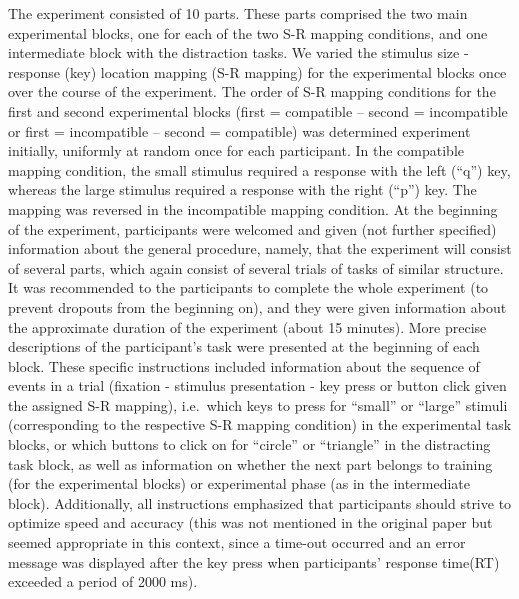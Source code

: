 \documentclass[
  english,
  man,floatsintext]{apa6}
\begin{document}
The experiment consisted of 10 parts. These parts comprised the two main experimental blocks, one for each of the two S-R mapping conditions, and one intermediate block with the distraction tasks. We varied the stimulus size - response (key) location mapping (S-R mapping) for the experimental blocks once over the course of the experiment. The order of S-R mapping conditions for the first and second experimental blocks (first = compatible -- second = incompatible or first = incompatible -- second = compatible) was determined experiment initially, uniformly at random once for each participant. In the compatible mapping condition, the small stimulus required a response with the left (\enquote{q}) key, whereas the large stimulus required a response with the right (\enquote{p}) key. The mapping was reversed in the incompatible mapping condition.
At the beginning of the experiment, participants were welcomed and given (not further specified) information about the general procedure, namely, that the experiment will consist of several parts, which again consist of several trials of tasks of similar structure. It was recommended to the participants to complete the whole experiment (to prevent dropouts from the beginning on), and they were given information about the approximate duration of the experiment (about 15 minutes).
More precise descriptions of the participant's task were presented at the beginning of each block. These specific instructions included information about the sequence of events in a trial (fixation - stimulus presentation - key press or button click given the assigned S-R mapping), i.e.~which keys to press for \enquote{small} or \enquote{large} stimuli (corresponding to the respective S-R mapping condition) in the experimental task blocks, or which buttons to click on for \enquote{circle} or \enquote{triangle} in the distracting task block, as well as information on whether the next part belongs to training (for the experimental blocks) or experimental phase (as in the intermediate block). Additionally, all instructions emphasized that participants should strive to optimize speed and accuracy (this was not mentioned in the original paper but seemed appropriate in this context, since a time-out occurred and an error message was displayed after the key press when participants' response time(RT) exceeded a period of 2000 ms).
\end{document}
